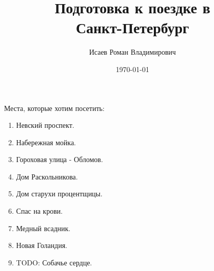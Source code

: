 \documentclass[oneside]{book}
\title{Подготовка к поездке в \\ Санкт-Петербург}
\date{\today}
\author{Исаев Роман Владимирович}
\begin{document}
    \maketitle
    
    Места, которые хотим посетить:
    \begin{enumerate}
        \item Невский проспект.
        \item Набережная мойка.
        \item Гороховая улица - Обломов.
        \item Дом Раскольникова.
        \item Дом старухи процентщицы.
        \item Спас на крови.
        \item Медный всадник.
        \item Новая Голандия.
        \item TODO: Собачье сердце.
    \end{enumerate}
\end{document}
